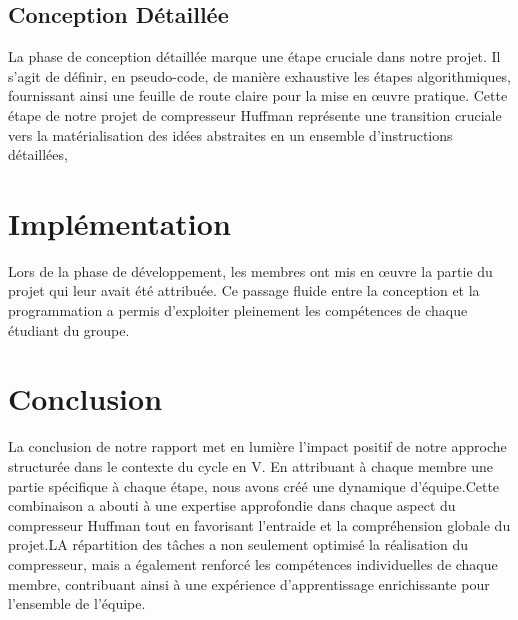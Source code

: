 \documentclass[12pt]{article}
\begin{document}
    \subsection{Conception Détaillée}
    La phase de conception détaillée marque une étape cruciale dans notre projet. Il s'agit de définir, en pseudo-code, de manière exhaustive les étapes algorithmiques, fournissant ainsi une feuille de route claire pour la mise en œuvre pratique. Cette étape de notre projet de compresseur Huffman représente une transition cruciale vers la matérialisation des idées abstraites en un ensemble d'instructions détaillées,
    
    
    
    
    
    
    
    


    \section{Implémentation}
    Lors de la phase de développement, les membres ont mis en œuvre la partie du projet qui leur avait été attribuée. Ce passage fluide entre la conception et la programmation a permis d'exploiter pleinement les compétences de chaque étudiant du groupe.
    


    \section{Conclusion}
    La conclusion de notre rapport met en lumière l'impact positif de notre approche structurée dans le contexte du cycle en V. En attribuant à chaque membre une partie spécifique à chaque étape, nous avons créé une dynamique d'équipe.Cette combinaison a abouti à une expertise approfondie dans chaque aspect du compresseur Huffman tout en favorisant l'entraide et la compréhension globale du projet.LA répartition des tâches a non seulement optimisé la réalisation du compresseur, mais a également renforcé les compétences individuelles de chaque membre, contribuant ainsi à une expérience d'apprentissage enrichissante pour l'ensemble de l'équipe.
\end{document}
